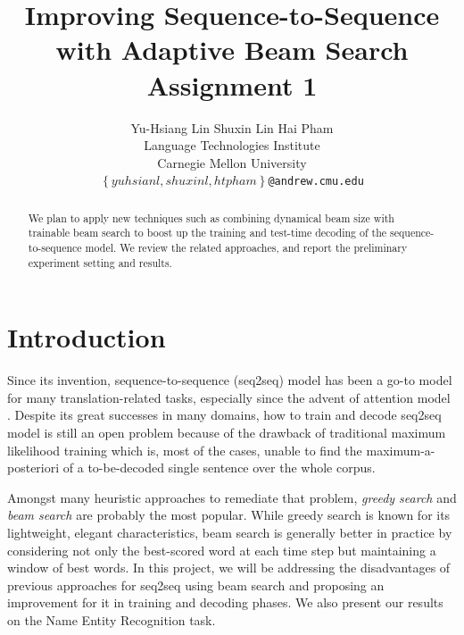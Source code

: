 \documentclass[11pt,a4paper]{article}
\title{Improving Sequence-to-Sequence with Adaptive Beam Search \newline \newline	
		Assignment 1}
\author{Yu-Hsiang Lin \quad Shuxin Lin \quad Hai Pham \\
  Language Technologies Institute \\
  Carnegie Mellon University \\
{\tt\small $\left\{yuhsianl, shuxinl, htpham\right\}$@andrew.cmu.edu}
  }
\date{}
\begin{document}
\maketitle
\begin{abstract}
We plan to apply new techniques such as combining dynamical beam size with trainable beam search to boost up the training and test-time decoding of the sequence-to-sequence model. We review the related approaches, and report the preliminary experiment setting and results.
\end{abstract}

\section{Introduction} \label{sec:introduction}
Since its invention, sequence-to-sequence (seq2seq) model \cite{seq2seq_2014} has been a go-to model for many translation-related tasks,  %
especially since the advent of attention model \cite{bahdanau2014neural,luong2015effective}. Despite its great successes in many domains, how to train and decode seq2seq model is still an open problem because of the drawback of traditional maximum likelihood training which is, most of the cases, unable to find the maximum-a-posteriori of a to-be-decoded single sentence over the whole corpus. 

Amongst many heuristic approaches to remediate that problem, \textit{greedy search} and \textit{beam search} are probably the most popular. While greedy search is known for its lightweight, elegant characteristics, beam search is generally better in practice by considering not only the best-scored word at each time step but maintaining a window of best words. 
In this project, we will be addressing the disadvantages of previous approaches for seq2seq using beam search and proposing an improvement for it in training and decoding phases. We also present our results on the Name Entity Recognition task.

\end{document}
